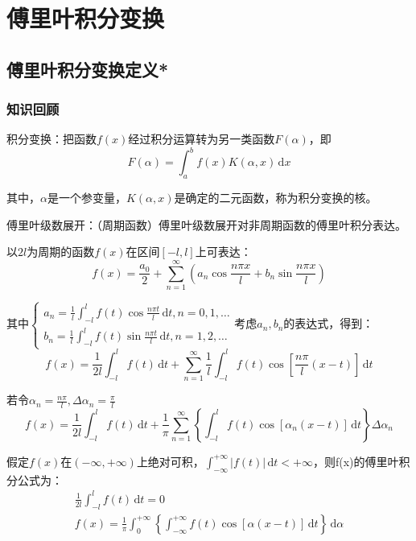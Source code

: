 \chapter{傅里叶积分变换}
 
\section{傅里叶积分变换定义*}

\subsection{知识回顾}
积分变换：把函数\(f(x)\)经过积分运算转为另一类函数\(F(\alpha)\)，即
\[
F(\alpha)=\int_{a}^{b}f(x)K(\alpha,x)\,\mathrm{d}x
\]

其中，\(\alpha\)是一个参变量，\(K(\alpha,x)\)是确定的二元函数，称为积分变换的核。

傅里叶级数展开：（周期函数）傅里叶级数展开对非周期函数的傅里叶积分表达。

以\(2l\)为周期的函数\(f(x)\)在区间\([-l,l]\)上可表达：\[f(x)=\frac{a_0}{2}+\sum_{n=1}^{\infty}{\left(a_n\cos\frac{n\pi x}{l}+b_n\sin\frac{n\pi x}{l}\right)}\]

其中\(\begin{cases}a_n=\frac{1}{l}\int_{-l}^{l}f(t)\cos\frac{n\pi t}{l}\,\mathrm{d}t,n=0,1,\ldots\\b_n=\frac{1}{l}\int_{-l}^{l}f(t)\sin\frac{n\pi t}{l}\,\mathrm{d}t,n=1,2,\ldots\end{cases}\)考虑\(a_n,b_n\)的表达式，得到：
\[
f(x)=\frac{1}{2l}\int_{-l}^{l} f(t)\,\mathrm{d}t+\sum_{n=1}^{\infty}\frac{1}{l}\int_{-l}^{l} f(t)\cos\left[\frac{n\pi}{l}(x-t)\right]\,\mathrm{d}t
\]

若令\(\alpha_n=\frac{n\pi}{l},\Delta\alpha_n=\frac{\pi}{l}\)
\[
f(x)=\frac{1}{2l}\int_{-l}^{l} f(t)\,\mathrm{d}t+\frac{1}{\pi}\sum_{n=1}^{\infty}\left\{\int_{-l}^{l} f(t)\cos\left[\alpha_n(x-t)\right]\,\mathrm{d}t\right\}\Delta\alpha_n
\]

假定\(f(x)\)在\((-\infty,+\infty)\)上绝对可积，\(\int_{-\infty}^{+\infty}|f(t)|\,\mathrm{d}t<+\infty\)，则f(x)的傅里叶积分公式为：
\begin{gather*}\frac{1}{2l}\int_{-l}^{l} f(t)\,\mathrm{d}t=0\\
f(x)=\frac{1}{\pi}\int_{0}^{+\infty}\left\{\int_{-\infty}^{+\infty}{f(t)\cos{\left[\alpha\left(x-t\right)\right]}\,\mathrm{d}t}\right\}\,\mathrm{d}\alpha
\end{gather*}

